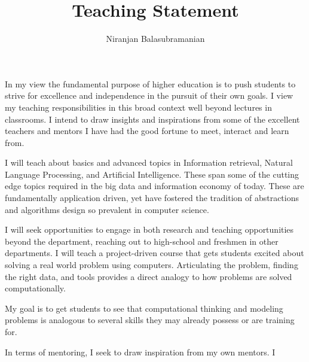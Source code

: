 \documentclass[a4paper,11pt,onecolumn]{article}
\begin{document}

\title{Teaching Statement}
\author{Niranjan Balasubramanian}
\maketitle

In my view the fundamental purpose of higher education is to push students to strive for excellence and independence in the pursuit of their own goals. I view my teaching responsibilities in this broad context well beyond lectures in classrooms. I intend to draw insights and inspirations from some of the excellent teachers and mentors I have had the good fortune to meet, interact and learn from.

I will teach about basics and advanced topics in Information retrieval, Natural Language Processing, and Artificial Intelligence. These span some of the cutting edge topics required in the big data and information economy of today. These are fundamentally application driven, yet have fostered the tradition of abstractions and algorithms design so prevalent in computer science. 

I will seek opportunities to engage in both research and teaching opportunities beyond the department, reaching out to high-school and freshmen in other departments. I will teach a project-driven course that gets students excited about solving a real world problem using computers. Articulating the problem, finding the right data, and tools provides a direct analogy to how problems are solved computationally. 

My goal is to get students to see that computational thinking and modeling problems is analogous to several skills they may already possess or are training for.

In terms of mentoring, I seek to draw inspiration from my own mentors. I 
\end{document}
